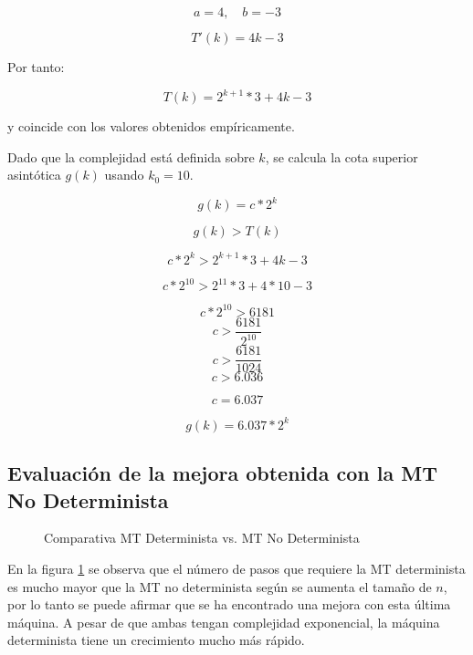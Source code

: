 \documentclass{uc3mpracticas}
\begin{document}
$$ a = 4 , \quad b = -3$$

$$ T'(k) = 4k - 3 $$

Por tanto:

$$ T(k) = 2^{k+1} * 3 + 4k - 3 $$

y coincide con los valores obtenidos empíricamente.

\vspace{2mm}

Dado que la complejidad está definida sobre $k$, se calcula la cota superior asintótica $g(k)$ usando $k_0 = 10$.

$$ g(k) = c*2^k $$

$$ g(k) > T(k) $$

$$ c*2^k > 2^{k+1} * 3 + 4k - 3 $$

$$ c*2^{10} > 2^{11} * 3 + 4*10 - 3 $$

$$ c*2^{10} > 6181 $$
$$ c > \frac{6181}{2^{10}} $$
$$ c > \frac{6181}{1024} $$
$$ c > 6.036 $$

$$ c = 6.037 $$

$$ g(k) = 6.037*2^k $$


\subsection{Evaluación de la mejora obtenida con la MT No Determinista}

\begin{figure}[!h]
  \caption{Comparativa MT Determinista vs. MT No Determinista}
  \label{fig:comparativaMTNoDet}
\end{figure}

En la figura \ref{fig:comparativaMTNoDet} se observa que el número de pasos que requiere la MT determinista es mucho mayor que la MT no determinista según se aumenta el tamaño de $n$, por lo tanto se puede afirmar que se ha encontrado una mejora con esta última máquina. A pesar de que ambas tengan complejidad exponencial, la máquina determinista tiene un crecimiento mucho más rápido.
\end{document}
